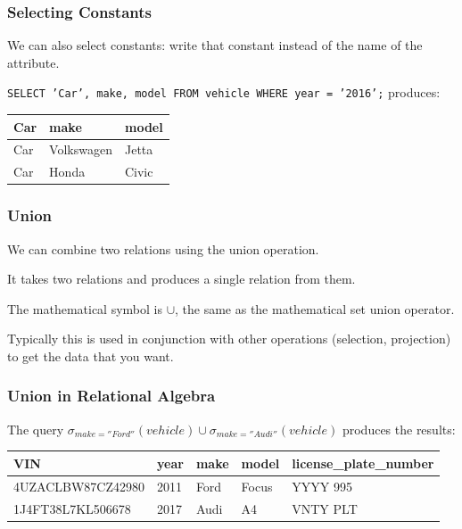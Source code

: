\begin{frame}
\frametitle{Selecting Constants}

We can also select constants: write that constant instead of the name of the attribute. 

\texttt{SELECT 'Car', make, model FROM vehicle WHERE year = '2016';} produces:

\begin{center}
\begin{tabular}{|l|l|l|} \hline
\textbf{Car} & \textbf{make} & \textbf{model} \\ \hline
	Car & Volkswagen & Jetta  \\ \hline
	Car &Honda & Civic \\ \hline
\end{tabular}
\end{center}


\end{frame}



\begin{frame}
\frametitle{Union}

We can combine two relations using the \alert{union} operation. 

It takes two relations and produces a single relation from them. 

The mathematical symbol is $\cup$, the same as the mathematical set union operator.

Typically this is used in conjunction with other operations (selection, projection) to get the data that you want.

\end{frame}



\begin{frame}
\frametitle{Union in Relational Algebra}

The query $\sigma_{make = ''Ford''}( vehicle ) \cup  \sigma_{make = ''Audi''}( vehicle )$ produces the results: 

{\small
\begin{center}
\begin{tabular}{|l|l|l|l|l|} \hline
	\textbf{VIN} & \textbf{year} & \textbf{make} & \textbf{model} & \textbf{license\_plate\_number} \\ \hline
	4UZACLBW87CZ42980 & 2011 & Ford & Focus & YYYY 995 \\ \hline
	1J4FT38L7KL506678 & 2017 & Audi & A4 & VNTY PLT \\ \hline
\end{tabular}
\end{center}
}


\end{frame}



